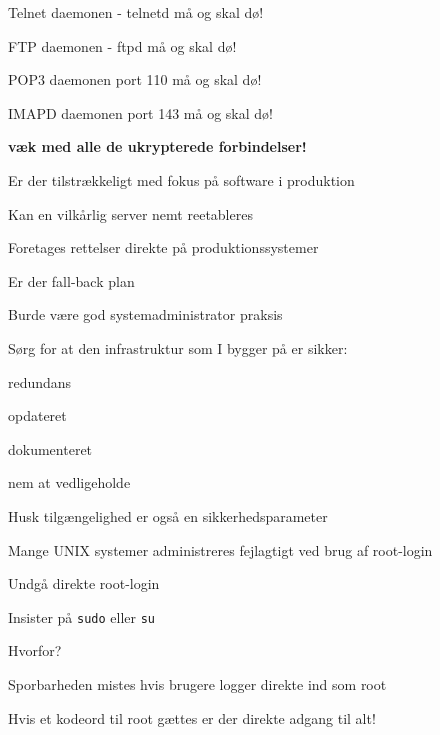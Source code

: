 \documentclass[Screen16to9,17pt]{foils}
\begin{document}
\centerline{\hlkbig Telnet daemonen - telnetd må og skal dø!}

\pause
\centerline{\hlkbig FTP daemonen - ftpd må og skal dø!}

\pause
\centerline{\hlkbig POP3 daemonen port 110 må og skal dø!}

\pause
\centerline{\hlkbig IMAPD daemonen port 143 må og skal dø!}

\pause
\vskip 1cm
\centerline{\hlkbig\bf væk med alle de ukrypterede forbindelser!}



\begin{list1}
\item Er der tilstrækkeligt med fokus på software i produktion
\item Kan en vilkårlig server nemt reetableres
\item Foretages rettelser direkte på produktionssystemer
\item Er der fall-back plan
\item Burde være god systemadministrator praksis
\end{list1}




\begin{list1}
\item Sørg for at den infrastruktur som I bygger på er sikker:
\begin{list2}
 \item redundans
       \item opdateret
        \item dokumenteret
        \item nem at vedligeholde
\end{list2}

\item  Husk tilgængelighed er også en sikkerhedsparameter
\end{list1}




\begin{list1}
\item Mange UNIX systemer administreres fejlagtigt ved brug af
  root-login
\item Undgå direkte root-login
\item Insister på \verb+sudo+ eller \verb+su+
\item Hvorfor?
\begin{list2}
\item Sporbarheden mistes hvis brugere logger direkte ind som root
\item Hvis et kodeord til root gættes er der direkte adgang til alt!
\end{list2}
\end{list1}

\end{document}
